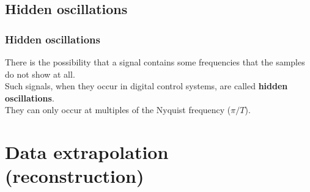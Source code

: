 \subsection{Hidden oscillations}

\begin{frame}
	\frametitle{Hidden oscillations}
	\begin{definition}
	There is the possibility that a signal contains some frequencies that the samples do not show at all. \\
	\vspace{1em}
	Such signals, when they occur in digital control systems, are called \textbf{hidden oscillations}.\\
	\vspace{1em}
	They can only occur at multiples of the Nyquist frequency ($\pi/T$).
	\end{definition}
\end{frame}

\section{Data extrapolation (reconstruction)}

